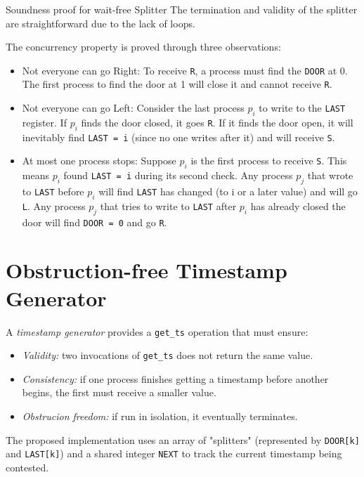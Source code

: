 \begin{Thm}{Soundness proof for wait-free Splitter}{}
    The termination and validity of the splitter are straightforward due to the lack of loops. 
    \begin{demonstration}
    The concurrency property is proved through three observations:
    \begin{itemize}
        \item Not everyone can go Right: To receive \texttt{R}, a process must find the \texttt{DOOR} at 0. The first process to find the door at 1 will close it and cannot receive \texttt{R}.
        \item Not everyone can go Left: Consider the last process $p_i$ to write to the \texttt{LAST} register. If $p_i$ finds the door closed, it goes \texttt{R}. If it finds the door open, it will inevitably find \texttt{LAST = i} (since no one writes after it) and will receive \texttt{S}.
        \item At most one process stops: Suppose $p_i$ is the first process to receive \texttt{S}. This means $p_i$ found \texttt{LAST = i} during its second check. Any process $p_j$ that wrote to \texttt{LAST} before $p_i$ will find \texttt{LAST} has changed (to i or a later value) and will go \texttt{L}. Any process $p_j$ that tries to write to \texttt{LAST} after $p_i$ has already closed the door will find \texttt{DOOR = 0} and go \texttt{R}.
    \end{itemize}
    \end{demonstration}
\end{Thm}

\section{Obstruction-free Timestamp Generator}
A \textit{timestamp generator} provides a \texttt{get\_ts} operation that must ensure:
\begin{itemize}
    \item \textit{Validity:} two invocations of \texttt{get\_ts} does not return the same value.
    \item \textit{Consistency:} if one process finishes getting a timestamp before another begins, the first must receive a smaller value.
    \item \textit{Obstrucion freedom:} if run in isolation, it eventually terminates.
\end{itemize}

The proposed implementation uses an array of "splitters" (represented by \texttt{DOOR[k]} and \texttt{LAST[k]}) and a shared integer \texttt{NEXT} to track the current timestamp being contested.

